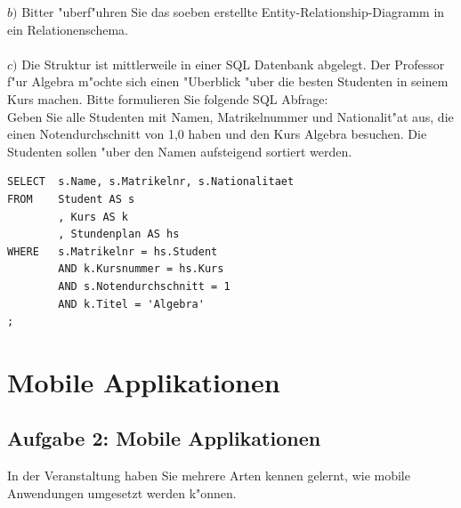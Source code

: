 \noindent
$b)$ Bitter "uberf"uhren Sie das soeben erstellte Entity-Relationship-Diagramm in ein Relationenschema.\\


\noindent
{}\\


\noindent
$c)$ Die Struktur ist mittlerweile in einer SQL Datenbank abgelegt.
Der Professor f"ur Algebra m"ochte sich einen "Uberblick "uber die besten Studenten in seinem Kurs machen.
Bitte formulieren Sie folgende SQL Abfrage:\\
Geben Sie alle Studenten mit Namen, Matrikelnummer und Nationalit"at aus, die einen Notendurchschnitt von 1,0 haben und den Kurs Algebra besuchen.
Die Studenten sollen "uber den Namen aufsteigend sortiert werden.

\lstset{style=customSQL}
\begin{lstlisting}
SELECT  s.Name, s.Matrikelnr, s.Nationalitaet
FROM    Student AS s
        , Kurs AS k
        , Stundenplan AS hs
WHERE   s.Matrikelnr = hs.Student
        AND k.Kursnummer = hs.Kurs
        AND s.Notendurchschnitt = 1
        AND k.Titel = 'Algebra'
;
\end{lstlisting}




\section{Mobile Applikationen}

\subsection{Aufgabe 2: Mobile Applikationen}
In der Veranstaltung haben Sie mehrere Arten kennen gelernt, wie mobile Anwendungen umgesetzt werden k"onnen.\\

